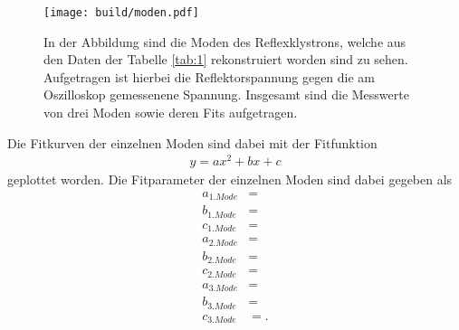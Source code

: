                 \begin{figure}[H]
                    \centering
                    \texttt{[image: build/moden.pdf]}
                    \caption{
                        In der Abbildung sind die Moden des Reflexklystrons, welche aus den Daten
                        der Tabelle \ref{tab:1} rekonstruiert worden sind zu sehen. Aufgetragen ist 
                        hierbei die Reflektorspannung gegen die am Oszilloskop gemessenene Spannung. Insgesamt sind die Messwerte von drei
                        Moden sowie deren Fits aufgetragen.
                    }
                    \label{fig:8}
                \end{figure}
                Die Fitkurven der einzelnen Moden sind dabei mit der Fitfunktion
                \begin{align}
                    y = a x^2 + b x + c
                \end{align}
                geplottet worden. Die Fitparameter der einzelnen Moden sind dabei gegeben als
                \begin{align}
                    a_{1.Mode} &= \text{}\\
                    b_{1.Mode} &= \text{}\\
                    c_{1.Mode} &= \text{}\\
                    a_{2.Mode} &= \text{}\\
                    b_{2.Mode} &= \text{}\\
                    c_{2.Mode} &= \text{}\\
                    a_{3.Mode} &= \text{}\\
                    b_{3.Mode} &= \text{}\\
                    c_{3.Mode} &= \text{}.
                \end{align}

